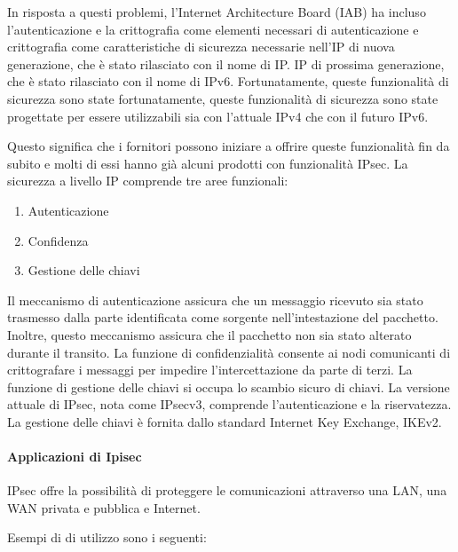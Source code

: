 \singlespacing

In risposta a questi problemi, l'Internet Architecture Board (IAB) ha incluso l'autenticazione e la crittografia come elementi necessari di autenticazione e crittografia come caratteristiche di sicurezza necessarie nell'IP di nuova generazione, che è stato rilasciato con il nome di IP. 
IP di prossima generazione, che è stato rilasciato con il nome di IPv6. Fortunatamente, queste funzionalità di sicurezza sono state fortunatamente, queste funzionalità di sicurezza sono state progettate per essere utilizzabili sia con l'attuale IPv4 che con il futuro IPv6. 

\singlespacing

Questo significa che i fornitori possono iniziare a offrire queste funzionalità fin da subito e molti di essi hanno già
alcuni prodotti con funzionalità IPsec.
La sicurezza a livello IP comprende tre aree funzionali:

\begin{enumerate}
    \item Autenticazione
    
    \item Confidenza 
    
    \item Gestione delle chiavi
\end{enumerate}

Il meccanismo di autenticazione assicura che un messaggio ricevuto sia stato trasmesso dalla parte identificata come sorgente nell'intestazione del pacchetto. Inoltre, questo meccanismo assicura che il pacchetto non sia stato alterato durante il transito. La funzione di confidenzialità consente ai nodi comunicanti di crittografare i messaggi per impedire l'intercettazione da parte di terzi. La funzione di gestione delle chiavi si occupa lo scambio sicuro di chiavi. La versione attuale di IPsec, nota come IPsecv3, comprende l'autenticazione e la riservatezza. La gestione delle chiavi è fornita dallo standard Internet Key Exchange, IKEv2.

\newpage
\paragraph{Applicazioni di Ipisec} IPsec offre la possibilità di proteggere le comunicazioni attraverso una LAN, una WAN privata e pubblica e Internet. 

\singlespacing

Esempi di di utilizzo sono i seguenti:

